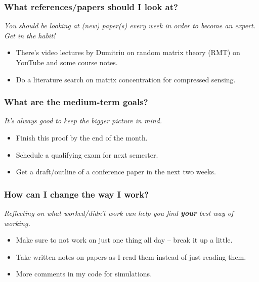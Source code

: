 \documentclass[10pt, letter]{article}
\begin{document}
\subsubsection*{What references/papers should I look at?}

\textit{You should be looking at (new) paper(s) every week in order to become an expert. Get in the habit!}

\begin{note}
\begin{itemize}
\item There's video lectures by Dumitriu on random matrix theory (RMT) on YouTube and some course notes.
\item Do a literature search on matrix concentration for compressed sensing.
\end{itemize}
\end{note}

\subsubsection*{What are the medium-term goals?}  

\textit{It's always good to keep the bigger picture in mind.}

\begin{note}
\begin{itemize}
\item Finish this proof by the end of the month.
\item Schedule a qualifying exam for next semester.
\item Get a draft/outline of a conference paper in the next two weeks.
\end{itemize}
\end{note}

\subsubsection*{How can I change the way I work?}

\textit{Reflecting on what worked/didn't work can help you find \textbf{your} best way of working.}

\begin{note}
\begin{itemize}
\item Make sure to not work on just one thing all day -- break it up a little.
\item Take written notes on papers as I read them instead of just reading them.
\item More comments in my code for simulations.
\end{itemize}
\end{note}
\end{document}
